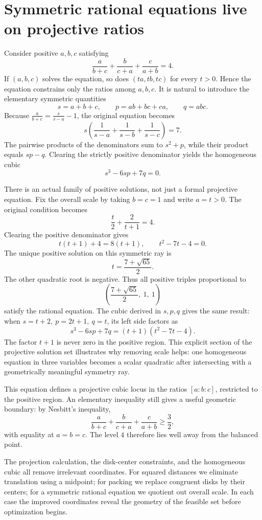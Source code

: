 \section{Symmetric rational equations live on projective ratios}

Consider positive \(a,b,c\) satisfying
\[
 \frac a{b+c}+\frac b{c+a}+\frac c{a+b}=4.
\]
If \((a,b,c)\) solves the equation, so does \((ta,tb,tc)\) for every \(t>0\). Hence the equation constrains only the ratios among \(a,b,c\). It is natural to introduce the elementary symmetric quantities
\[
 s=a+b+c,\qquad p=ab+bc+ca,\qquad q=abc.
\]
Because \(\tfrac a{b+c}=\tfrac{s}{s-a}-1\), the original equation becomes
\[
 s\left(\frac1{s-a}+\frac1{s-b}+\frac1{s-c}\right)=7.
\]
The pairwise products of the denominators sum to \(s^2+p\), while their product equals \(sp-q\). Clearing the strictly positive denominator yields the homogeneous cubic
\[
 \boxed{s^3-6sp+7q=0.}
\]

There is an actual family of positive solutions, not just a formal projective equation. Fix the overall scale by taking \(b=c=1\) and write \(a=t>0\). The original condition becomes
\[
 \frac t2+\frac2{t+1}=4.
\]
Clearing the positive denominator gives
\[
 t(t+1)+4=8(t+1),
 \qquad t^2-7t-4=0.
\]
The unique positive solution on this symmetric ray is
\[
 \boxed{t=\frac{7+\sqrt{65}}2.}
\]
The other quadratic root is negative. Thus all positive triples proportional to
\[
 \left(\frac{7+\sqrt{65}}2,\ 1,\ 1\right)
\]
satisfy the rational equation. The cubic derived in \(s,p,q\) gives the same result: when \(s=t+2,\ p=2t+1,\ q=t\), its left side factors as
\[
 s^3-6sp+7q=(t+1)(t^2-7t-4).
\]
The factor \(t+1\) is never zero in the positive region. This explicit section of the projective solution set illustrates why removing scale helps: one homogeneous equation in three variables becomes a scalar quadratic after intersecting with a geometrically meaningful symmetry ray.

This equation defines a projective cubic locus in the ratios \([a:b:c]\), restricted to the positive region. An elementary inequality still gives a useful geometric boundary: by Nesbitt's inequality,
\[
 \frac a{b+c}+\frac b{c+a}+\frac c{a+b}\ge\frac32,
\]
with equality at \(a=b=c\). The level \(4\) therefore lies well away from the balanced point.

The projection calculation, the disk-center constraints, and the homogeneous cubic all remove irrelevant coordinates. For squared distances we eliminate translation using a midpoint; for packing we replace congruent disks by their centers; for a symmetric rational equation we quotient out overall scale. In each case the improved coordinates reveal the geometry of the feasible set before optimization begins.
